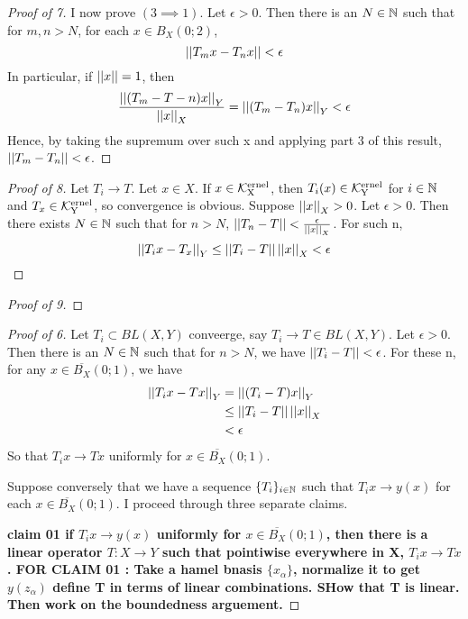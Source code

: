 \begin{prop}
\begin{proof}[Proof of 7]
    I now prove $(3 \implies 1)$. 
    Let $\epsilon > 0$.
    Then there is an $N \in \mathbb{N}$ 
    such that for $m,n>N$, 
    for each $x \in B_X(0;2)$, 
    \begin{equation*}
    \left|\left| T_mx-T_nx \right|\right| < \epsilon
    \end{equation*}
    In particular, if $\left|\left| x \right|\right|=1$, then 
    \begin{equation}
    \frac{\left|\left| (T_m-T-n)x \right|\right|_Y}{\left|\left| x \right|\right|_X} =\left|\left| (T_m-T_n)x \right|\right|_Y < \epsilon
    \end{equation}
    Hence, by taking the supremum over such x
    and applying part 3 of this result, 
    $\left|\left| T_m-T_n \right|\right| < \epsilon$. 
\end{proof}
\begin{proof}[Proof of 8]
    Let $T_i \to T$. 
    Let $x \in X$. 
    If $x \in \bf\mathcal{K}\rm^{ernel}_X$, then $T_i(x) \in \bf\mathcal{K}\rm^{ernel}_Y$ for $i \in \mathbb{N}$ and $T_x \in \bf\mathcal{K}\rm^{ernel}_Y$, 
    so convergence is obvious. 
    Suppose $\left|\left| x \right|\right|_X > 0$. 
    Let $\epsilon > 0$. 
    Then there exists $N \in \mathbb{N}$ such that
    for $n>N$, $\left|\left| T_n-T \right|\right| < \frac{\epsilon}{\left|\left| x \right|\right|_X}$.
    For such n, 
    \begin{equation*}
    \left|\left| T_ix-T_x \right|\right|_Y \leq \left|\left| T_i-T \right|\right| \left|\left| x \right|\right|_X < \epsilon
    \end{equation*}
\end{proof}
\begin{proof}[Proof of 9]
\end{proof}
\begin{proof}[Proof of 6] %
    Let $T_i \subset BL(X,Y)$ conveerge, say $T_i \to T \in BL(X,Y)$. 
    Let $\epsilon > 0$. 
    Then there is an $N \in \mathbb{N}$
    such that for $n>N$, 
    we have 
    $\left|\left| T_i-T \right|\right| < \epsilon$. 
    For these n, for any $x \in \overline{B_X}(0;1)$, we have
    \begin{align*}
    \left|\left| T_ix-Tx \right|\right|_Y& = \left|\left| (T_i-T)x \right|\right|_Y \\
    & \leq \left|\left| T_i-T \right|\right| \left|\left| x \right|\right|_X\\
    & < \epsilon 
    \end{align*}
    So that $T_ix \to Tx$ uniformly for $x \in \overline{B_X}(0;1)$. 

    Suppose conversely that we have a sequence
    $\{T_i\}_{i \in \mathbb{N}}$ 
    such that $T_ix \to y(x)$ for each $x \in \overline{B_X}(0;1)$. 
    I proceed through three separate claims.
    
    \bf claim 01 \rm if $T_ix \to y(x)$ uniformly for $x \in \overline{B_X}(0;1)$, then
    there is a linear operator $T:X \to Y$ such that pointiwise everywhere in X, $T_ix \to Tx$. 
    \bf FOR CLAIM 01 \rm: Take a hamel bnasis $\{x_\alpha\}$, normalize it to get $y(z_\alpha)$ define T in terms of linear combinations. SHow that T is linear. Then work on the boundedness arguement. 
    


\end{proof}
\end{prop}
